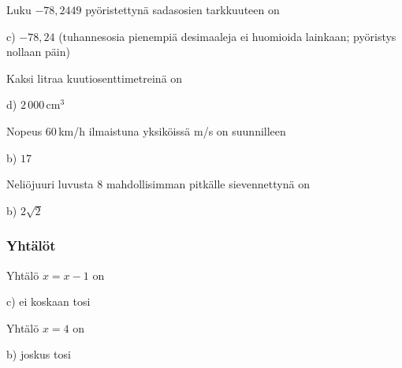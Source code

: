 \begin{tehtava}
Luku $-78,2449$ pyöristettynä sadasosien tarkkuuteen on
\begin{vastaus}
c) $-78,24$ (tuhannesosia pienempiä desimaaleja ei huomioida lainkaan; pyöristys nollaan päin)
\end{vastaus}
\end{tehtava}

\begin{tehtava}
Kaksi litraa kuutiosenttimetreinä on	
	\begin{vastaus}
	d) $2\,000$\,cm$^3$
	\end{vastaus}
\end{tehtava}

\begin{tehtava}
Nopeus $60$\,km/h ilmaistuna yksiköissä m/s on suunnilleen
	\begin{vastaus}
	b) $17$
	\end{vastaus}
\end{tehtava}

\begin{tehtava}
Neliöjuuri luvusta $8$ mahdollisimman pitkälle sievennettynä on

  \begin{vastaus}
	 b) $2\sqrt{2}$
    \end{vastaus}
\end{tehtava}

\subsubsection*{Yhtälöt}

\begin{tehtava}
Yhtälö $x = x-1$ on
\begin{vastaus}
c) ei koskaan tosi
\end{vastaus}
\end{tehtava}

\begin{tehtava}
Yhtälö $x = 4$ on
\begin{vastaus}
b) joskus tosi
\end{vastaus}
\end{tehtava}

